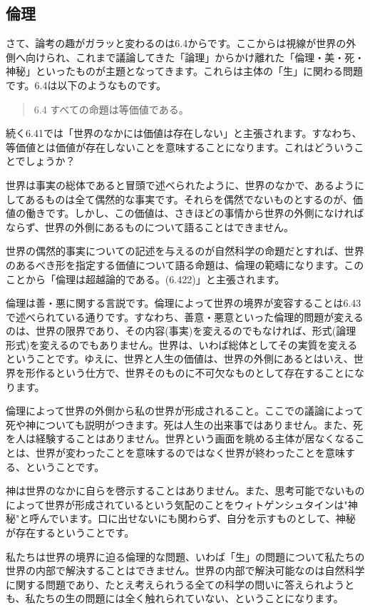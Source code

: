 \documentclass[12pt]{jsarticle}
\begin{document}
\subsection{倫理}
さて、論考の趣がガラッと変わるのは6.4からです。ここからは視線が世界の外側へ向けられ、これまで議論してきた「論理」からかけ離れた「倫理・美・死・神秘」といったものが主題となってきます。これらは主体の「生」に関わる問題です。6.4は以下のようなものです。
\begin{quote}
6.4 すべての命題は等価値である。
\end{quote}
続く6.41では「世界のなかには価値は存在しない」と主張されます。すなわち、等価値とは価値が存在しないことを意味することになります。これはどういうことでしょうか？
\par
世界は事実の総体であると冒頭で述べられたように、世界のなかで、あるようにしてあるものは全て偶然的な事実です。それらを偶然でないものとするのが、価値の働きです。しかし、この価値は、さきほどの事情から世界の外側になければならず、世界の外側にあるものについて語ることはできません。\par
世界の偶然的事実についての記述を与えるのが自然科学の命題だとすれば、世界のあるべき形を指定する価値について語る命題は、倫理の範疇になります。このことから「倫理は超越論的である。(6.422)」と主張されます。\par
倫理は善・悪に関する言説です。倫理によって世界の境界が変容することは6.43で述べられている通りです。すなわち、善意・悪意といった倫理的問題が変えるのは、世界の限界であり、その内容(事実)を変えるのでもなければ、形式(論理形式)を変えるのでもありません。世界は、いわば総体としてその実質を変えるということです。ゆえに、世界と人生の価値は、世界の外側にあるとはいえ、世界を形作るという仕方で、世界そのものに不可欠なものとして存在することになります。
\par
倫理によって世界の外側から私の世界が形成されること。ここでの議論によって死や神についても説明がつきます。死は人生の出来事ではありません。また、死を人は経験することはありません。世界という画面を眺める主体が居なくなることは、世界が変わったことを意味するのではなく世界が終わったことを意味する、ということです。
\par
神は世界のなかに自らを啓示することはありません。また、思考可能でないものによって世界が形成されているという気配のことをウィトゲンシュタインは"神秘"と呼んでいます。口に出せないにも関わらず、自分を示すものとして、神秘が存在するということです。
\par
私たちは世界の境界に迫る倫理的な問題、いわば「生」の問題について私たちの世界の内部で解決することはできません。世界の内部で解決可能なのは自然科学に関する問題であり、たとえ考えられうる全ての科学の問いに答えられようとも、私たちの生の問題には全く触れられていない、ということになります。
\end{document}
